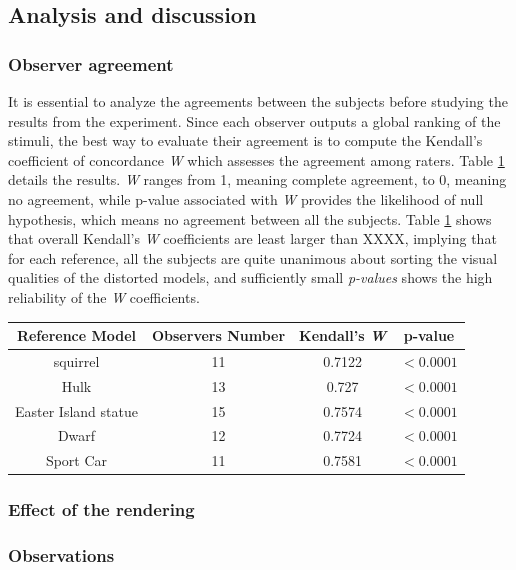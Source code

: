\subsection{Analysis and discussion}
\subsubsection{Observer agreement}
It is essential to analyze the agreements between the subjects before studying the results from the experiment. Since each observer outputs a global ranking of the stimuli, the best way to evaluate their agreement is to compute the Kendall's coefficient of concordance \textit{W} \cite{Kendall_1940} which assesses the agreement among raters. Table \ref{tab-W} details the results. \textit{W} ranges from 1, meaning complete agreement, to 0, meaning no agreement, while p-value associated with \textit{W} provides the likelihood of null hypothesis, which means no agreement between all the subjects. Table \ref{tab-W} shows that overall Kendall’s \textit{W} coefficients are least larger than XXXX, implying that for each reference, all the subjects are quite unanimous about sorting the visual qualities of the distorted models, and sufficiently small \textit{p-values} shows the high reliability of the \textit{W} coefficients.\\
\begin{table}

    \begin{tabular}{c c  c c}
        \textbf{Reference Model} & \textbf{Observers Number} & \textbf{Kendall's \textit{W}} & \textbf{p-value} \\ \hline
        squirrel & 11 & 0.7122 & $<0.0001$ \\ 
        Hulk & 13 & 0.727 & $<0.0001$ \\ 
        Easter Island statue & 15 & 0.7574 & $<0.0001$ \\ 
        Dwarf & 12 & 0.7724 & $<0.0001$ \\ 
        Sport Car & 11 & 0.7581 & $<0.0001$ \\ \hline
    \end{tabular}%
		
   \label{tab-W}
\end{table}


\subsubsection{Effect of the rendering}


\subsubsection{Observations}